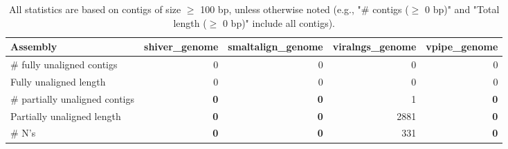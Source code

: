 \documentclass[12pt,a4paper]{article}
\begin{document}
\begin{table}[ht]
\begin{center}
\caption{All statistics are based on contigs of size $\geq$ 100 bp, unless otherwise noted (e.g., "\# contigs ($\geq$ 0 bp)" and "Total length ($\geq$ 0 bp)" include all contigs).}
\begin{tabular}{|l*{4}{|r}|}
\hline
Assembly & shiver\_genome & smaltalign\_genome & viralngs\_genome & vpipe\_genome \\ \hline
\# fully unaligned contigs & 0 & 0 & 0 & 0 \\ \hline
Fully unaligned length & 0 & 0 & 0 & 0 \\ \hline
\# partially unaligned contigs & {\bf 0} & {\bf 0} & 1 & {\bf 0} \\ \hline
Partially unaligned length & {\bf 0} & {\bf 0} & 2881 & {\bf 0} \\ \hline
\# N's & {\bf 0} & {\bf 0} & 331 & {\bf 0} \\ \hline
\end{tabular}
\end{center}
\end{table}
\end{document}
